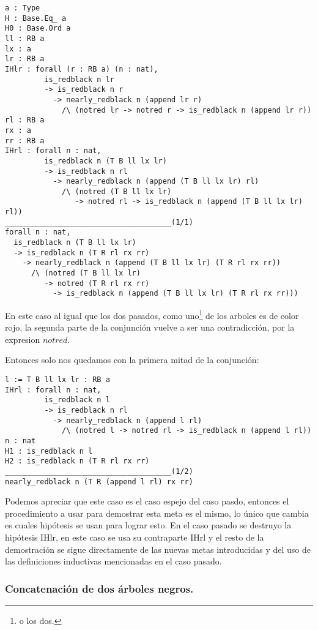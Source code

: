 \begin{verbatim}
a : Type
H : Base.Eq_ a
H0 : Base.Ord a
ll : RB a
lx : a
lr : RB a
IHlr : forall (r : RB a) (n : nat),
         is_redblack n lr
         -> is_redblack n r
           -> nearly_redblack n (append lr r)
             /\ (notred lr -> notred r -> is_redblack n (append lr r))
rl : RB a
rx : a
rr : RB a
IHrl : forall n : nat,
         is_redblack n (T B ll lx lr)
         -> is_redblack n rl
           -> nearly_redblack n (append (T B ll lx lr) rl)
             /\ (notred (T B ll lx lr)
                -> notred rl -> is_redblack n (append (T B ll lx lr) rl))
______________________________________(1/1)
forall n : nat,
  is_redblack n (T B ll lx lr)
  -> is_redblack n (T R rl rx rr)
    -> nearly_redblack n (append (T B ll lx lr) (T R rl rx rr))
      /\ (notred (T B ll lx lr)
         -> notred (T R rl rx rr)
           -> is_redblack n (append (T B ll lx lr) (T R rl rx rr)))
\end{verbatim}

En este caso al igual que los dos pasados, como uno\footnote{o los dos.} de los arboles es de
color rojo, la segunda parte de la conjunci\'on vuelve a ser una contradicci\'on, por la expresion
$notred$.

Entonces solo nos quedamos con la primera mitad de la conjunci\'on:

\begin{verbatim}
l := T B ll lx lr : RB a
IHrl : forall n : nat,
         is_redblack n l
         -> is_redblack n rl
           -> nearly_redblack n (append l rl)
             /\ (notred l -> notred rl -> is_redblack n (append l rl))
n : nat
H1 : is_redblack n l
H2 : is_redblack n (T R rl rx rr)
______________________________________(1/2)
nearly_redblack n (T R (append l rl) rx rr)
\end{verbatim}

Podemos apreciar que este caso es el caso espejo del caso pasdo, entonces el procedimiento a usar
para demostrar esta meta es el mismo, lo \'unico que cambia es cuales hip\'otesis se usan para
lograr esto. En el caso pasado se destruyo la hip\'otesis IHlr, en este caso se usa su contraparte
IHrl y el resto de la demostraci\'on se sigue directamente de las nuevas metas introducidas y del
uso de las definiciones inductivas mencionadas en el caso pasado.

\subsubsection{Concatenaci\'on de dos \'arboles negros.}

